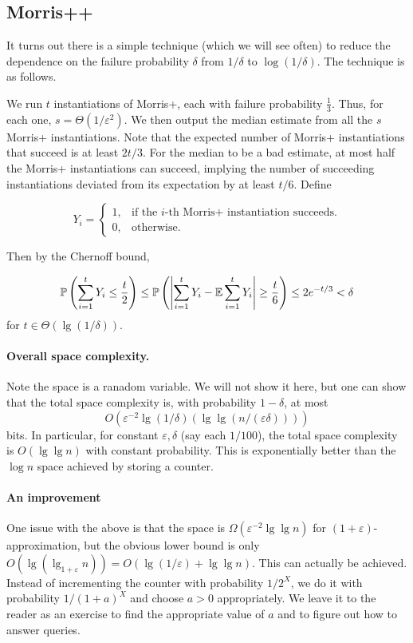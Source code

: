 \documentclass[11pt]{article}
\newcommand{\eps}{\varepsilon}
\DeclarePairedDelimiter\abs{\lvert}{\rvert}
\begin{document}
\subsection{Morris++}

It turns out there is a simple technique (which we will see often) to reduce the dependence on the failure probability $\delta$ from $1/\delta$ to $\log(1/\delta)$. The technique is as follows.

We run $t$ instantiations of Morris+, each with failure probability $\frac{1}{3}$. Thus, for each one, $s=\Theta(1/\varepsilon^2)$. We then output the median estimate from all the $s$ Morris+ instantiations. Note that the expected number of Morris+ instantiations that succeed is at least $2t/3$. For the median to be a bad estimate, at most half the Morris+ instantiations can succeed, implying the number of succeeding instantiations deviated from its expectation by at least $t/6$. Define

\begin{equation}
  Y_i=\begin{cases}
    1, & \text{if the $i$-th Morris+ instantiation succeeds.}\\
    0, & \text{otherwise}.
  \end{cases}
\end{equation}

Then by the Chernoff bound, 

\begin{align}
\mathbb{P}\left(\sum_{i = 1}^{t}{Y_i}\le \frac{t}{2}\right) \le \mathbb{P}\left(\abs*{\sum_{i = 1}^{t} Y_i - \mathbb{E}\sum_{i = 1}^{t} Y_i} \ge \frac{t}{6}\right) \le 2e^{-t/3}<\delta
\end{align}
for $t\in \Theta(\lg(1/\delta))$.

\paragraph{Overall space complexity.} Note the space is a ranadom variable. We will not show it here, but one can show that the total space complexity is, with probability $1-\delta$, at most
$$
O(\eps^{-2}\lg(1/\delta)(\lg\lg(n/(\eps\delta)))) 
$$
bits. In particular, for constant $\eps,\delta$ (say each $1/100$), the total space complexity is $O(\lg\lg n)$ with constant probability. This is exponentially better than the $\log n$ space achieved by storing a counter.

\paragraph{An improvement}
One issue with the above is that the space is $\Omega(\eps^{-2}\lg\lg n)$ for $(1+\eps)$-approximation, but the obvious lower bound is only $O(\lg(\lg_{1+\eps} n)) = O(\lg(1/\eps) + \lg\lg n)$. This can actually be achieved. Instead of incrementing the counter with probability $1/2^X$, we do it with probability $1/(1+a)^X$ and choose $a>0$ appropriately. We leave it to the reader as an exercise to find the appropriate value of $a$ and to figure out how to answer queries.

\nocite{*}




\end{document}
